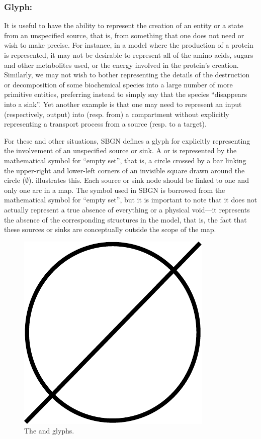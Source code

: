 \subsubsection{Glyph: }
\label{sec:sourceSink}

It is useful to have the ability to represent the creation of an entity or
a state from an unspecified source, that is, from something that one does
not need or wish to make precise.  For instance, in a model where the
production of a protein is represented, it may not be desirable to
represent all of the amino acids, sugars and other metabolites used, or the
energy involved in the protein's creation.  Similarly, we may not wish to
bother representing the details of the destruction or decomposition of some
biochemical species into a large number of more primitive entities,
preferring instead to simply say that the species ``disappears into a
sink''.  Yet another example is that one may need to represent an input
(respectively, output) into (resp. from) a compartment without explicitly
representing a transport process from a source (resp. to a target).

For these and other situations, SBGN defines a glyph for explicitly
representing the involvement of an unspecified source or sink. A  or  is represented by the mathematical symbol for ``empty
set'', that is, a circle crossed by a bar linking the upper-right and
lower-left corners of an invisible square drawn around the circle ($\emptyset$).
 illustrates this. Each source or sink node should be linked to one
and only one arc in a map. The symbol
used in SBGN is borrowed from the mathematical symbol for ``empty set'',
but it is important to note that it does not actually represent a true
absence of everything or a physical void---it represents the absence of the
corresponding structures in the model, that is, the fact that these sources
or sinks are conceptually outside the scope of the map. 

\begin{figure}[H]
  \centering
  \includegraphics[scale = 0.3]{le_images/sourceSink}
  \caption{The  and  glyphs.}
  \label{fig:sourceSink}
\end{figure}


